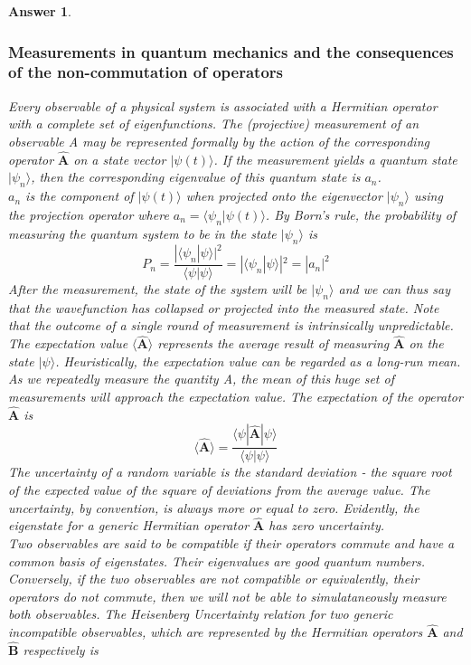 \documentclass[a4paper]{article}
\newtheorem{ans}{Answer}[subsection]
\theoremstyle{new}
\begin{document}
\begin{ans}
\subsubsection*{Measurements in quantum mechanics and the consequences of the non-commutation of operators}
Every observable of a physical system is associated with a Hermitian operator with a complete set of eigenfunctions. The (projective) measurement of an observable A may be represented formally by the action of the corresponding operator $\mathbf{\hat{A}}$ on a state vector $|\psi(t)\big\rangle$. If the measurement yields a quantum state $|\psi_n\big\rangle$, then the corresponding eigenvalue of this quantum state is $a_n$.\\[5pt]
$a_n$ is the component of $|\psi(t)\big\rangle$ when projected onto the eigenvector $|\psi_n\big\rangle$ using the projection operator where $a_n=\big\langle\psi_n|\psi(t)\big\rangle$. By Born's rule, the probability of measuring the quantum system to be in the state $|\psi_n\big\rangle$ is 
$$P_n=\frac{|\big\langle\psi_n|\psi\big\rangle|^2}{\big\langle\psi|\psi\big\rangle}=|\big\langle\psi_n|\psi\big\rangle|^2=|a_n|^2$$
After the measurement, the state of the system will be $|\psi_n\big\rangle$  and we can thus say that the wavefunction has collapsed or projected into the measured state. Note that the outcome of a single round of measurement is intrinsically unpredictable.\\[5pt]
The expectation value $\big\langle\mathbf{\hat{A}}\big\rangle$ represents the average result of measuring $\mathbf{\hat{A}}$ on the state $|\psi\big\rangle$. Heuristically, the expectation value can be regarded as a long-run mean. As we repeatedly measure the quantity A, the mean of this huge set of measurements will approach the expectation value. The expectation of the operator $\mathbf{\hat{A}}$ is
$$\langle\mathbf{\hat{A}}\rangle=\frac{\langle\psi|\mathbf{\hat{A}}|\psi\rangle}{\langle\psi|\psi\rangle}$$
The uncertainty of a random variable is the standard deviation - the square root of the expected value of the square of deviations from the average value. The uncertainty, by convention, is always more or equal to zero. Evidently, the eigenstate for a generic Hermitian operator $\mathbf{\hat{A}}$ has zero uncertainty.\\[5pt]
Two observables are said to be compatible if their operators commute and have a common basis of eigenstates. Their eigenvalues are good quantum numbers. Conversely, if the two observables are not compatible or equivalently, their operators do not commute, then we will not be able to simulataneously measure both observables. The Heisenberg Uncertainty relation for two generic incompatible observables, which are represented by the  Hermitian operators $\mathbf{\hat{A}}$ and $\mathbf{\hat{B}}$ respectively is

\end{ans}
\end{document}
